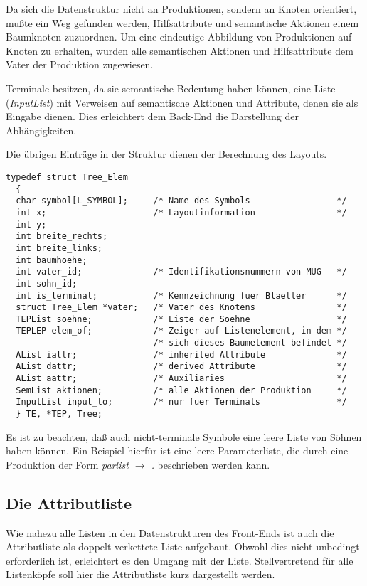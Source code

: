 Da sich die Datenstruktur nicht an Produktionen, sondern an Knoten orientiert, mu\ss{}te ein Weg gefunden werden, Hilfsattribute
und semantische Aktionen einem Baumknoten zuzuordnen. Um eine eindeutige Abbildung von Produktionen auf Knoten zu erhalten, wurden alle
semantischen Aktionen und Hilfsattribute dem Vater der Produktion zugewiesen.

Terminale besitzen, da sie semantische Bedeutung haben k\"onnen, eine Liste ({\it InputList}) mit Verweisen auf semantische Aktionen und Attribute, denen
sie als Eingabe dienen. Dies erleichtert dem Back-End die Darstellung der Abh\"angigkeiten.

Die \"ubrigen Eintr\"age in der Struktur dienen der Berechnung des Layouts.

\begin{small}\begin{verbatim}
typedef struct Tree_Elem
  {
  char symbol[L_SYMBOL];     /* Name des Symbols                 */
  int x;                     /* Layoutinformation                */
  int y;
  int breite_rechts;
  int breite_links;
  int baumhoehe;
  int vater_id;              /* Identifikationsnummern von MUG   */
  int sohn_id;
  int is_terminal;           /* Kennzeichnung fuer Blaetter      */
  struct Tree_Elem *vater;   /* Vater des Knotens                */
  TEPList soehne;            /* Liste der Soehne                 */
  TEPLEP elem_of;            /* Zeiger auf Listenelement, in dem */
                             /* sich dieses Baumelement befindet */
  AList iattr;               /* inherited Attribute              */
  AList dattr;               /* derived Attribute                */
  AList aattr;               /* Auxiliaries                      */
  SemList aktionen;          /* alle Aktionen der Produktion     */
  InputList input_to;        /* nur fuer Terminals               */
  } TE, *TEP, Tree;
\end{verbatim}\end{small}

Es ist zu beachten, da\ss{} auch nicht-terminale Symbole eine leere Liste von S\"ohnen haben k\"onnen. Ein Beispiel hierf\"ur ist eine leere Parameterliste, die
durch eine Produktion der Form {\it parlist $\rightarrow$ .} beschrieben werden kann.

\subsection{Die Attributliste}

Wie nahezu alle Listen in den Datenstrukturen des Front-Ends ist auch die Attributliste als doppelt verkettete Liste aufgebaut. Obwohl dies nicht
unbedingt erforderlich ist, erleichtert es den Umgang mit der Liste. Stellvertretend f\"ur alle Listenk\"opfe soll hier die Attributliste kurz
dargestellt werden.

